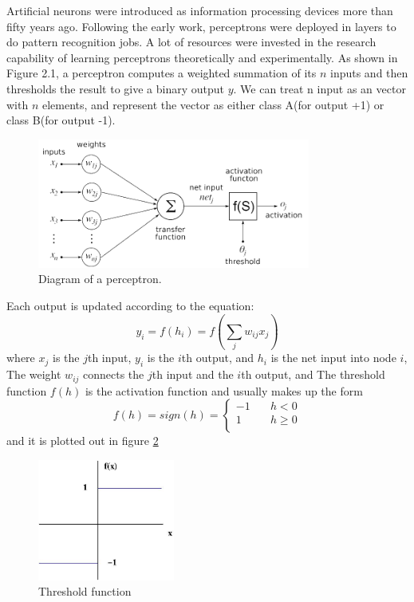 Artificial neurons were introduced as information processing devices more than fifty years ago\citep{mcculloch1943logical}. Following the early work, perceptrons were deployed in layers to do pattern recognition jobs. A lot of resources were invested in the research capability of learning perceptrons theoretically and experimentally. As shown in Figure 2.1, a perceptron computes a weighted summation of its $n$ inputs and then thresholds the result to give a binary output $y$. We can treat n input as an vector with $n$ elements, and represent the vector as either class A(for output +1) or class B(for output -1).
\graphicspath{ {./Figures/} }
\begin{figure}[!htb]
\centering
\includegraphics[width=0.8\textwidth]{Figure2-1.png}
\caption{\label{fig:perceptron}Diagram of a perceptron.}
\end{figure}

Each output is updated according to the equation:
\begin{equation}\label{eq:BasicEq}
y_{i} = f(h_{i}) = f\left(\sum_{j}w_{ij}x_{j}\right)
\end{equation}
where $x_{j}$ is the $j$th input, $y_{i}$ is the $i$th output, and $h_{i}$ is the net input into node $i$, The weight $w_{ij}$ connects the $j$th input and the $i$th output, and  The threshold function $f(h)$ is the activation function and usually makes up the form
\begin{equation}\label{eq:FullEq}
f(h) = sign(h) = 
  \begin{cases}
    -1       & \quad h < 0 \\
    1  & \quad h \geq 0\\
  \end{cases}
\end{equation}
and it is plotted out in figure \ref{fig:ThresholdFunc}
\graphicspath{ {./Figures/} }
\begin{figure}[!htb]
\centering
\includegraphics[width=0.4\textwidth]{bipolar-threshold.jpg}
\caption{\label{fig:ThresholdFunc}Threshold function}
\end{figure}


